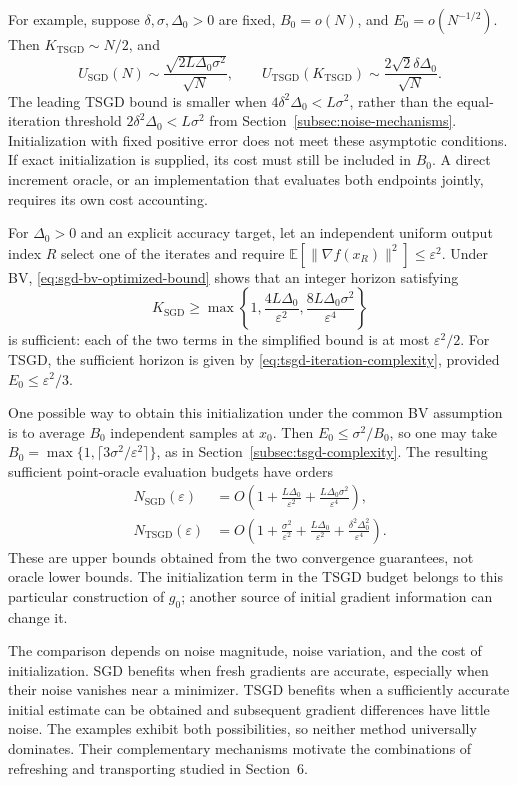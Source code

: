 For example, suppose $\delta,\sigma,\Delta_0>0$ are fixed,
$B_0=o(N)$, and $E_0=o(N^{-1/2})$. Then
$K_{\mathrm{TSGD}}\sim N/2$, and
\[
U_{\mathrm{SGD}}(N)
\sim\frac{\sqrt{2L\Delta_0\sigma^2}}{\sqrt N},\qquad
U_{\mathrm{TSGD}}(K_{\mathrm{TSGD}})
\sim\frac{2\sqrt2\delta\Delta_0}{\sqrt N}.
\]
The leading TSGD bound is smaller when
$4\delta^2\Delta_0<L\sigma^2$, rather than the equal-iteration
threshold $2\delta^2\Delta_0<L\sigma^2$ from
Section~\ref{subsec:noise-mechanisms}. Initialization with fixed
positive error does not meet these asymptotic conditions. If exact
initialization is supplied, its cost must still be included in
$B_0$. A direct increment oracle, or an implementation that evaluates
both endpoints jointly, requires its own cost accounting.

For $\Delta_0>0$ and an explicit accuracy target, let an independent
uniform output index $R$ select one of the iterates and require
$\mathbb E[\|\nabla f(x_R)\|^2]\leq\varepsilon^2$.
Under BV, \eqref{eq:sgd-bv-optimized-bound} shows that an integer
horizon satisfying
\[
K_{\mathrm{SGD}}\geq
\max\left\{1,\frac{4L\Delta_0}{\varepsilon^2},
              \frac{8L\Delta_0\sigma^2}{\varepsilon^4}\right\}
\]
is sufficient: each of the two terms in the simplified bound is at
most $\varepsilon^2/2$. For TSGD, the sufficient horizon is given
by \eqref{eq:tsgd-iteration-complexity}, provided
$E_0\leq\varepsilon^2/3$.

One possible way to obtain this initialization under the common BV
assumption is to average $B_0$ independent samples at $x_0$.
Then $E_0\leq\sigma^2/B_0$, so one may take
$B_0=\max\{1,\lceil3\sigma^2/\varepsilon^2\rceil\}$, as in
Section~\ref{subsec:tsgd-complexity}. The resulting sufficient
point-oracle evaluation budgets have orders
\begin{equation}
\label{eq:comparison-oracle-complexities}
\begin{aligned}
N_{\mathrm{SGD}}(\varepsilon)
&=O\!\left(1+\frac{L\Delta_0}{\varepsilon^2}
             +\frac{L\Delta_0\sigma^2}{\varepsilon^4}\right),\\
N_{\mathrm{TSGD}}(\varepsilon)
&=O\!\left(1+\frac{\sigma^2}{\varepsilon^2}
             +\frac{L\Delta_0}{\varepsilon^2}
             +\frac{\delta^2\Delta_0^2}{\varepsilon^4}\right).
\end{aligned}
\end{equation}
These are upper bounds obtained from the two convergence guarantees,
not oracle lower bounds. The initialization term in the TSGD budget
belongs to this particular construction of $g_0$; another source of
initial gradient information can change it.

The comparison depends on noise magnitude, noise variation, and
the cost of initialization. SGD benefits when fresh gradients are
accurate, especially when their noise vanishes near a minimizer.
TSGD benefits when a sufficiently accurate initial estimate can be
obtained and subsequent gradient differences have little noise.
The examples exhibit both possibilities, so neither method
universally dominates. Their complementary mechanisms motivate
the combinations of refreshing and transporting studied in
Section~6.
